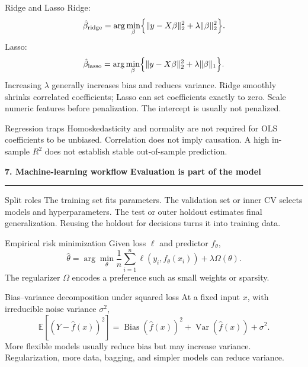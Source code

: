 \documentclass[10pt,a4paper]{article}
\newcommand{\sectionbanner}[2]{%
  \vspace{2mm}
  {\color{navy}\Large\bfseries #1}\hfill
  {\color{blue}\bfseries #2}
  \par\vspace{1mm}\color{line}\rule{\linewidth}{0.8pt}\color{ink}\vspace{2mm}
}
\newcommand{\subbanner}[1]{%
  \vspace{2mm}{\color{navy}\large\bfseries #1}\par
  \vspace{-1mm}{\color{line}\rule{\linewidth}{0.5pt}}\color{ink}\vspace{1mm}
}
\newcommand{\E}{\mathbb{E}}
\newcommand{\Var}{\operatorname{Var}}
\begin{document}
\begin{formulabox}{Ridge and Lasso}
Ridge:
\[
\hat\beta_{\mathrm{ridge}}
=\arg\min_{\beta}\Bigl\{\lVert y-X\beta\rVert_2^2
+\lambda\lVert\beta\rVert_2^2\Bigr\}.
\]
Lasso:
\[
\hat\beta_{\mathrm{lasso}}
=\arg\min_{\beta}\Bigl\{\lVert y-X\beta\rVert_2^2
+\lambda\lVert\beta\rVert_1\Bigr\}.
\]
Increasing $\lambda$ generally increases bias and reduces variance. Ridge smoothly shrinks correlated coefficients; Lasso can set coefficients exactly to zero. Scale numeric features before penalization. The intercept is usually not penalized.
\end{formulabox}

\begin{trapbox}{Regression traps}
Homoskedasticity and normality are not required for OLS coefficients to be unbiased. Correlation does not imply causation. A high in-sample $R^2$ does not establish stable out-of-sample prediction.
\end{trapbox}

\sectionbanner{7. Machine-learning workflow}{Evaluation is part of the model}

\begin{keybox}{Split roles}
The training set fits parameters. The validation set or inner CV selects models and hyperparameters. The test or outer holdout estimates final generalization. Reusing the holdout for decisions turns it into training data.
\end{keybox}

\begin{formulabox}{Empirical risk minimization}
Given loss $\ell$ and predictor $f_\theta$,
\[
\hat\theta=\arg\min_\theta\frac1n\sum_{i=1}^{n}\ell(y_i,f_\theta(x_i))
+\lambda\Omega(\theta).
\]
The regularizer $\Omega$ encodes a preference such as small weights or sparsity.
\end{formulabox}

\begin{formulabox}{Bias--variance decomposition under squared loss}
At a fixed input $x$, with irreducible noise variance $\sigma^2$,
\[
\E[(Y-\hat f(x))^2]
=\operatorname{Bias}(\hat f(x))^2
+\Var(\hat f(x))+\sigma^2.
\]
More flexible models usually reduce bias but may increase variance. Regularization, more data, bagging, and simpler models can reduce variance.
\end{formulabox}

\subbanner{Cross-validation}
\end{document}
